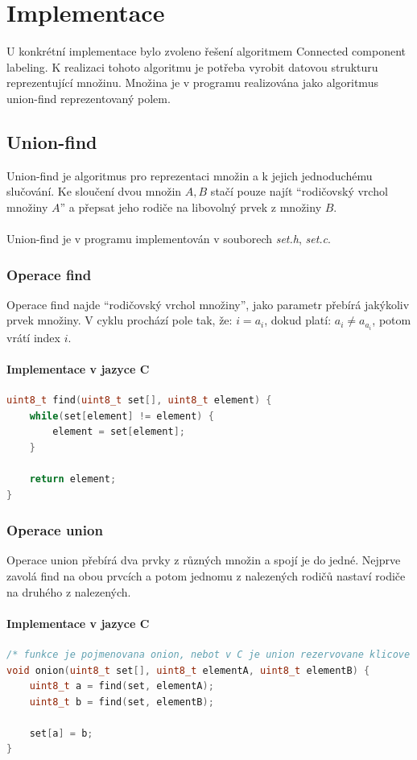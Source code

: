 \chapter{Implementace}
U konkrétní implementace bylo zvoleno řešení algoritmem Connected component
labeling. K realizaci tohoto algoritmu je potřeba vyrobit datovou strukturu
reprezentující množinu. Množina je v programu realizována jako algoritmus
union-find reprezentovaný polem.

\section{Union-find}
Union-find je algoritmus pro reprezentaci množin a k jejich
jednoduchému slučování. Ke sloučení dvou množin $A,B$ stačí pouze najít
``rodičovský vrchol množiny $A$'' a přepsat jeho rodiče na libovolný prvek z
množiny $B$.
\\
\\
Union-find je v programu implementován v souborech \emph{set.h}, \emph{set.c}.

\subsection{Operace find}
Operace find najde ``rodičovský vrchol množiny'', jako parametr přebírá
jakýkoliv prvek množiny. V cyklu prochází pole tak, že: $i = a_i$, dokud platí:
$a_i \neq a_{a_i}$, potom vrátí index $i$.

\subsubsection{Implementace v jazyce C}
\begin{lstlisting}[language=C++, caption={Operace find}, label={source:tbbinit}]
uint8_t find(uint8_t set[], uint8_t element) {
	while(set[element] != element) {
		element = set[element];
	}

	return element;
}
\end{lstlisting}

\subsection{Operace union}
Operace union přebírá dva prvky z různých množin a spojí je do jedné. Nejprve
zavolá find na obou prvcích a potom jednomu z nalezených rodičů nastaví rodiče
na druhého z nalezených.

\subsubsection{Implementace v jazyce C}
\begin{lstlisting}[language=C++, caption={Operace union}, label={source:tbbinit}]
/* funkce je pojmenovana onion, nebot v C je union rezervovane klicove slovo */
void onion(uint8_t set[], uint8_t elementA, uint8_t elementB) {
	uint8_t a = find(set, elementA);
	uint8_t b = find(set, elementB);

	set[a] = b;
}
\end{lstlisting}

